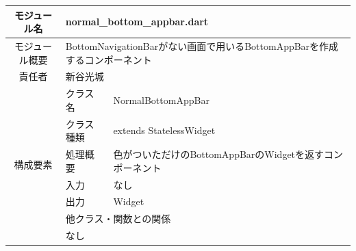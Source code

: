 \begin{table}[H]
  \centering
  \begin{tabular}{|c|l|l|} \hline
    モジュール名                & \multicolumn{2}{l|}{normal\_bottom\_appbar.dart}                                                                                                   \\ \hline
    モジュール概要               & \multicolumn{2}{p{12cm}|}{BottomNavigationBarがない画面で用いるBottomAppBarを作成するコンポーネント}                                                                    \\ \hline
    責任者                   & \multicolumn{2}{l|}{新谷光城}                                                                                                                          \\ \hline
    \multirow{7}{*}{構成要素} & クラス名                                                                            & NormalBottomAppBar                                               \\ \cline{2-3}
                          & クラス種類                                                                           & extends StatelessWidget                                          \\ \cline{2-3}
                          & 処理概要                                                                            & \multicolumn{1}{p{12cm}|}{色がついただけのBottomAppBarのWidgetを返すコンポーネント} \\ \cline{2-3}
                          & 入力                                                                              & なし                                                               \\ \cline{2-3}
                          & 出力                                                                              & Widget                                                           \\ \cline{2-3}
                          & \multicolumn{2}{l|}{他クラス・関数との関係}                                                                                                                   \\ \cline{2-3}
                          & \multicolumn{2}{p{14cm}|}{なし}                                                                                                                      \\ \hline
  \end{tabular}
\end{table}


